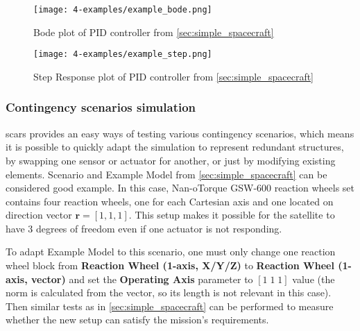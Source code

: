         \begin{figure}[H]
            \centering
            \texttt{[image: 4-examples/example\_bode.png]}
            \caption{Bode plot of PID controller from \autoref{sec:simple_spacecraft}}
            \label{fig:example_bode}
        \end{figure}
        \vfill
        \begin{figure}[H]
            \centering
            \texttt{[image: 4-examples/example\_step.png]}
            \caption{Step Response plot of PID controller from \autoref{sec:simple_spacecraft}}
            \label{fig:example_step}
        \end{figure}


        

    \subsubsection{Contingency scenarios simulation}
        \ac{scars} provides an easy ways of testing various contingency scenarios, which means it is possible to quickly adapt the simulation to represent redundant structures, by swapping one sensor or actuator for another, or just by modifying existing elements. Scenario and Example Model from \autoref{sec:simple_spacecraft} can be considered good example. In this case, Nan-oTorque GSW-600 reaction wheels set contains four reaction wheels, one for each Cartesian axis and one located on direction vector $\textbf{r} = [1, 1, 1]$. This setup makes it possible for the satellite to have 3 degrees of freedom even if one actuator is not responding.

        To adapt Example Model to this scenario, one must only change one reaction wheel block from \textbf{Reaction Wheel (1-axis, X/Y/Z)} to \textbf{Reaction Wheel (1-axis, vector)} and set the \textbf{Operating Axis} parameter to $[1\; 1\; 1]$ value (the norm is calculated from the vector, so its length is not relevant in this case). Then similar tests as in \autoref{sec:simple_spacecraft} can be performed to measure whether the new setup can satisfy the mission's requirements.
